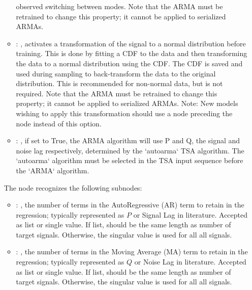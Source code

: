 \begin{itemize}
\begin{itemize}
            observed switching between modes. Note that the ARMA must be
            retrained to change this property; it cannot be applied to serialized ARMAs. 
          \item {}: ,
            activates a transformation of the signal to a normal distribution before
            training. This is done by fitting a CDF to the data and then transforming the
            data to a normal distribution using the CDF. The CDF is saved and used during
            sampling to back-transform the data to the original distribution. This is
            recommended for non-normal data, but is not required. Note that the ARMA must be
            retrained to change this property; it cannot be applied to serialized ARMAs.
            Note: New models wishing to apply this transformation should use a
             node preceding the  node instead of this
            option. 
          \item {}: ,
            if set to True, the ARMA algorithm will use P and Q, the signal and
            noise lag respectively, determined by the `autoarma` TSA algorithm.
            The `autoarma` algorithm must be selected in the TSA input sequence before
            the `ARMA` algorithm. 
      \end{itemize}

      The  node recognizes the following subnodes:
      \begin{itemize}
        \item {}: ,
          the number of terms in the AutoRegressive (AR) term to retain in the
          regression; typically represented as $P$ or Signal Lag in literature.
          Accepted as list or single value. If list, should be the same length as
          number of target signals. Otherwise, the singular value is used for all
          all signals.

        \item {}: ,
          the number of terms in the Moving Average (MA) term to retain in the
          regression; typically represented as $Q$ or Noise Lag in literature.
          Accepted as list or single value. If list, should be the same length as
          number of target signals. Otherwise, the singular value is used for all
          all signals.
      \end{itemize}


\end{itemize}
